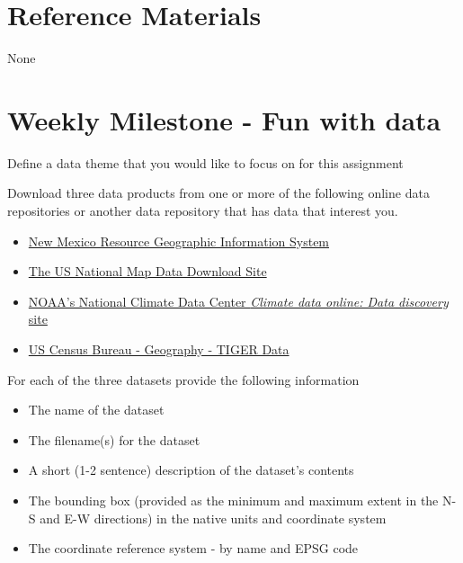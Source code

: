 \documentclass[]{book}
\providecommand{\tightlist}{%
  \setlength{\itemsep}{0pt}\setlength{\parskip}{0pt}}
\begin{document}
\section{Reference Materials}\label{week05-reference}

None

\section{Weekly Milestone - Fun with data}\label{week05-milestone}

\begin{description}
\tightlist
\item[Question 1]
Define a data theme that you would like to focus on for this assignment
\end{description}

Download three data products from one or more of the following online
data repositories or another data repository that has data that interest
you.

\begin{itemize}
\tightlist
\item
  \href{http://rgis.unm.edu/}{New Mexico Resource Geographic Information
  System}
\item
  \href{http://nationalmap.gov/small_scale/atlasftp.html}{The US
  National Map Data Download Site}
\item
  \href{http://www.ncdc.noaa.gov/cdo-web/datasets}{NOAA's National
  Climate Data Center \emph{Climate data online: Data discovery} site}
\item
  \href{http://www.census.gov/geo/maps-data/data/tiger.html}{US Census
  Bureau - Geography - TIGER Data}
\end{itemize}

\begin{description}
\tightlist
\item[Question 2]
For each of the three datasets provide the following information
\end{description}

\begin{itemize}
\tightlist
\item
  The name of the dataset
\item
  The filename(s) for the dataset
\item
  A short (1-2 sentence) description of the dataset's contents
\item
  The bounding box (provided as the minimum and maximum extent in the
  N-S and E-W directions) in the native units and coordinate system
\item
  The coordinate reference system - by name and EPSG code
\end{itemize}
\end{document}
